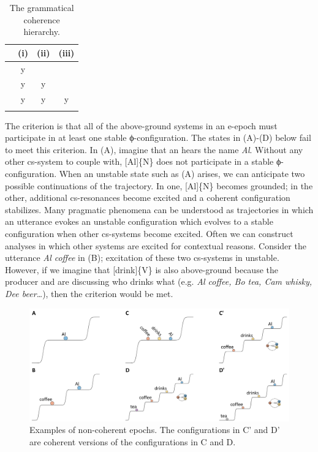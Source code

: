 \begin{table}
\begin{tabularx}{.66\textwidth}{rCCC}
\lsptoprule
& (i) & (ii) & (iii)\\
\midrule 
\raggedleft {} & y &  & \\
\raggedleft {} & y & y & \\
\raggedleft {} & y & y & y\\
\lspbottomrule
\end{tabularx}
\caption{The grammatical coherence hierarchy.}\label{tab:6:1}
\end{table}
  The  criterion is that all of the above-ground systems in an e-epoch must participate in at least one stable ϕ-configuration. The states in {}(A)-(D) below fail to meet this criterion. In (A), imagine that an  hears the name \textit{Al}. Without any other cs-system to couple with, [Al]\{N\} does not participate in a stable ϕ-configuration. When an unstable state such as (A) arises, we can anticipate two possible continuations of the trajectory. In one, [Al]\{N\} becomes grounded; in the other, additional cs-resonances become excited and a coherent configuration stabilizes. Many pragmatic phenomena can be understood as trajectories in which an utterance evokes an unstable configuration which evolves to a stable configuration when other cs-systems become excited. Often we can construct analyses in which other systems are excited for contextual reasons. Consider the utterance \textit{Al coffee} in (B); excitation of these two cs-systems in unstable. However, if we imagine that [drink]\{V\} is also above-ground because the producer and  are discussing who drinks what (e.g. \textit{Al coffee, Bo tea, Cam whisky, Dee beer…}), then the  criterion would be met.

  
\begin{figure}
\includegraphics[width=\textwidth]{figures/Tilsen-img124.png}
\caption{Examples of non-coherent epochs. The configurations in C' and D' are coherent versions of the configurations in C and D.}
\label{fig:6:5}
\end{figure}
 

